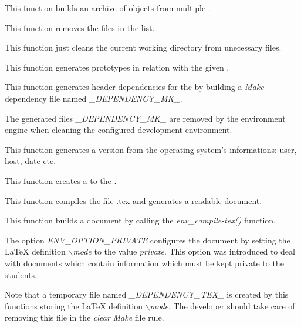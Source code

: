          {
	   This function builds an archive of objects from multiple
	   .
	 }

         {
	   This function removes the files in the list.
	 }

         {
	   This function just cleans the current working directory from
	   unecessary files.
	 }

         {
	   This function generates prototypes in relation with the given
	   .
	 }

         {
	   This function generates header dependencies for the 
	   by building a \textit{Make} dependency file named
	   \textit{\_DEPENDENCY\_MK\_}.

	   \-

	   The generated files \textit{\_DEPENDENCY\_MK\_} are removed by
	   the environment engine when cleaning the configured development
	   environment.
	 }

         {
	   This function generates a version  from the operating
	   system's informations: user, host, date etc.
	 }

         {
	   This function creates a  to the .
	 }

         {
	   This function compiles the file .tex and
	   generates a readable document.
	 }

         {
	   This function builds a document by calling the
           \textit{env\_compile-tex()} function.

	   \-

           The option \textit{ENV\_OPTION\_PRIVATE} configures the document
	   by setting the {\LaTeX} definition \textit{$\backslash$mode} to
	   the value \textit{private}. This option was introduced to deal with
	   documents which contain information which must be kept private to
	   the students.

	   \-

	   Note that a temporary file named \textit{\_DEPENDENCY\_TEX\_}
	   is created by this functions storing the {\LaTeX} definition
	   \textit{$\backslash$mode}. The developer should take care of
	   removing this file in the \textit{clear} \textit{Make} file rule.
	 }


